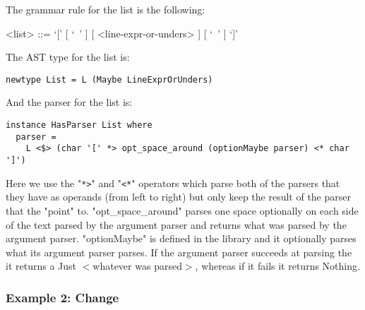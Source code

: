 \documentclass{article}
\begin{document}
The grammar rule for the list is the following:
\begin{grammar}
<list> ::= `[' [ `\ ' ] [ <line-expr-or-unders> ] [ `\ ' ] `]' \\
\end{grammar}
The AST type for the list is:
\begin{verbatim}
newtype List = L (Maybe LineExprOrUnders)

\end{verbatim}
And the parser for the list is:
\begin{verbatim}
instance HasParser List where
  parser =
    L <$> (char '[' *> opt_space_around (optionMaybe parser) <* char ']')

\end{verbatim}
Here we use the "\verb|*>|" and "\verb|<*|" operators which parse both of
the parsers that they have as operands (from left to right) but only keep the
result of the parser that the "point" to. "opt_space_around" parses one space
optionally on each side of the text parsed by the argument parser and returns
what was parsed by the argument parser.  "optionMaybe" is defined in the
library and it optionally parses what its argument parser parses. If the
argument parser succeeds at parsing the it returns a Just $<$whatever was
parsed$>$, whereas if it fails it returns Nothing.

\subsubsection{Example 2: Change}
\end{document}
